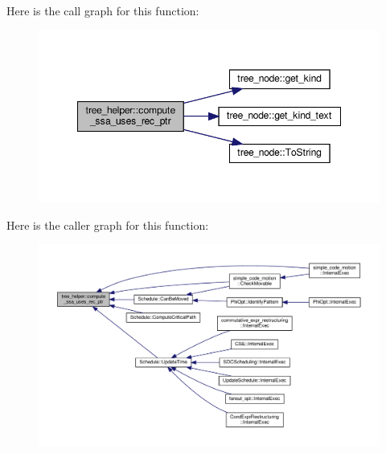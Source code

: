 Here is the call graph for this function\+:
\nopagebreak
\begin{figure}[H]
\begin{center}
\leavevmode
\includegraphics[width=348pt]{d7/d99/classtree__helper_aaa8a871e73116f94f3bb09dd4af063ef_cgraph}
\end{center}
\end{figure}
Here is the caller graph for this function\+:
\nopagebreak
\begin{figure}[H]
\begin{center}
\leavevmode
\includegraphics[width=350pt]{d7/d99/classtree__helper_aaa8a871e73116f94f3bb09dd4af063ef_icgraph}
\end{center}
\end{figure}
\mbox{\label{classtree__helper_a89952195432e48a6beba86df47fa88c7}} 
